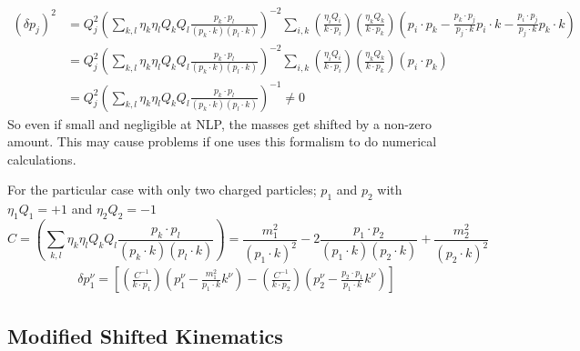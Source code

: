 \documentclass{article}
\begin{document}
\begin{align*}
	(\delta p_j)^2 &= Q^2_j\left(\sum_{k, l} \eta_k \eta_l Q_k Q_l \frac{p_k \cdot p_l}{(p_k \cdot k)(p_l \cdot k)}\right)^{-2}\sum_{i,k} \left(\frac{\eta_i Q_i}{k\cdot p_i}\right)\left(\frac{\eta_k Q_k}{k\cdot p_k}\right)  \left(p_i\cdot p_k - \frac{p_k\cdot p_j }{p_j\cdot k}p_i\cdot k - \frac{p_i\cdot p_j }{p_j\cdot k}p_k\cdot k\right)\\&
	=Q^2_j\left(\sum_{k, l} \eta_k \eta_l Q_k Q_l \frac{p_k \cdot p_l}{(p_k \cdot k)(p_l \cdot k)}\right)^{-2}\sum_{i,k} \left(\frac{\eta_i Q_i}{k\cdot p_i}\right)\left(\frac{\eta_k Q_k}{k\cdot p_k}\right)  \left(p_i\cdot p_k\right)\\&
	=Q^2_j\left(\sum_{k, l} \eta_k \eta_l Q_k Q_l \frac{p_k \cdot p_l}{(p_k \cdot k)(p_l \cdot k)}\right)^{-1} \neq 0
\end{align*}
So even if small and negligible at NLP, the masses get shifted by a non-zero amount. This may cause problems if one uses this formalism to do numerical calculations.

For the particular case with only two charged particles; $p_1$ and $p_2$ with $\eta_1Q_1=+1$ and $\eta_2Q_2=-1$
\begin{equation*}
	C = \left(\sum_{k, l} \eta_k \eta_l Q_k Q_l \frac{p_k \cdot p_l}{(p_k \cdot k)(p_l \cdot k)}\right)
	= \frac{m^2_1}{(p_1 \cdot k)^2} -2 \frac{p_1 \cdot p_2}{(p_1 \cdot k)(p_2 \cdot k)}+ \frac{m^2_2}{(p_2 \cdot k)^2}
\end{equation*}
\begin{align*}
	\delta p_1^\nu
	=\left[ \left(\frac{C^{-1}}{k\cdot p_1}\right)  \left(p_1^\nu - \frac{m_1^2}{p_1\cdot k}k^\nu\right) - \left(\frac{C^{-1}}{k\cdot p_2}\right)  \left(p_2^\nu - \frac{p_2\cdot p_1}{p_1\cdot k}k^\nu\right)\right]
\end{align*}


\subsection{Modified Shifted Kinematics}
\end{document}
